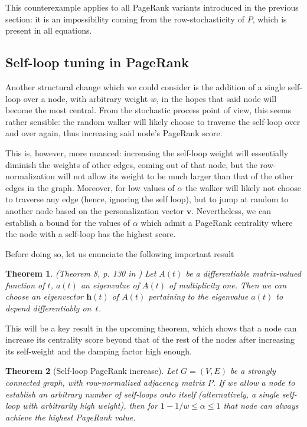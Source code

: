 \documentclass[sn-mathphys-ay]{sn-jnl}%
\newcommand{\bv}{\bm{v}}
\theoremstyle{thmstyleone}%
\newtheorem{theorem}{Theorem}%
\theoremstyle{thmstyletwo}%
\theoremstyle{thmstylethree}%
\begin{document}
This counterexample applies to all PageRank variants introduced in the previous section: it is an impossibility coming from the row-stochasticity of $P$, which is present in all equations.



\subsection{Self-loop tuning in PageRank}


Another structural change which we could consider is the addition of a single self-loop over a node, with arbitrary weight $w$, in the hopes that said node will become the most central. From the stochastic process point of view, this seems rather sensible: the random walker will likely choose to traverse the self-loop over and over again, thus increasing said node's PageRank score.

This is, however, more nuanced: increasing the self-loop weight will essentially diminish the weights of other edges, coming out of that node, but the row-normalization will not allow its weight to be much larger than that of the other edges in the graph. Moreover, for low values of $\alpha$ the walker will likely not choose to traverse any edge (hence, ignoring the self loop), but to jump at random to another node based on the personalization vector $\bv$. Nevertheless, we can establish a bound for the values of $\alpha$ which admit a PageRank centrality where the node with a self-loop has the highest score.

Before doing so, let us enunciate the following important result
\begin{theorem}(Theorem 8, p. 130 in \cite{lax2007linear}) \label{thm:lax}
	Let $A(t)$ be a differentiable matrix-valued function of $t$, $a(t)$ an eigenvalue of $A(t)$ of multiplicity one. Then we can choose an eigenvector $\bm{h}(t)$ of $A(t)$ pertaining to the eigenvalue $a(t)$ to depend differentiably on~$t$.
\end{theorem}

This will be a key result in the upcoming theorem, which shows that a node can increase its centrality score beyond that of the rest of the nodes after increasing its self-weight and the damping factor high enough.



\begin{theorem}[Self-loop PageRank increase]
	Let $G=(V,E)$ be a strongly connected graph, with row-normalized adjacency matrix $P$. If we allow a node to establish an arbitrary number of self-loops onto itself (alternatively, a single self-loop with arbitrarily high weight), then for $1-1/w \leq \alpha \leq 1$ that node can always achieve the highest PageRank value. 
\end{theorem}
\end{document}
